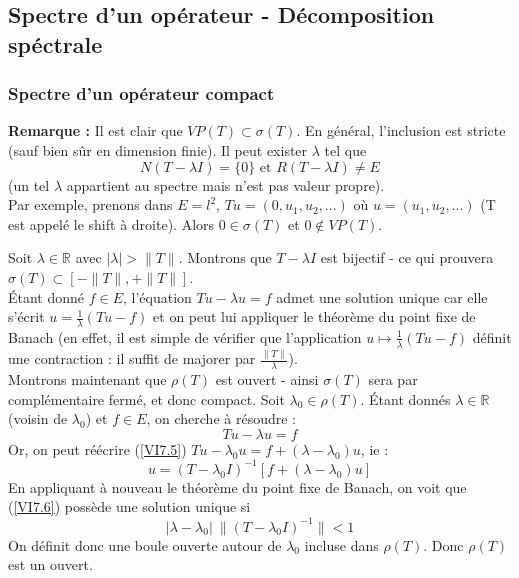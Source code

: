\subsection{Spectre d'un opérateur - Décomposition spéctrale}
\subsubsection{Spectre d'un opérateur compact}

\textbf{Remarque :} Il est clair que $VP(T)\subset \sigma(T)$. En général, l'inclusion est stricte (sauf bien sûr en dimension finie). Il peut exister $\lambda$ tel que 
\[N(T-\lambda I)=\{0\} \text{ et } R(T-\lambda I)\neq E\]
(un tel $\lambda$ appartient au spectre mais n'est pas valeur propre).\\
Par exemple, prenons dans $E=l^2$, $Tu=(0,u_1,u_2,...)$ où $u=(u_1,u_2,...)$ (T est appelé le shift à droite). Alors $0\in\sigma(T)$ et $0\not\in VP(T)$.


\begin{dem}
Soit $\lambda\in\mathbb{R}$ avec $|\lambda|>\|T\|$. Montrons que $T-\lambda I$ est bijectif - ce qui prouvera $\sigma(T)\subset [-\|T\|, +\|T\|]$.\\
Étant donné $f\in E$, l'équation $Tu-\lambda u=f$ admet une solution unique car elle s'écrit $u=\frac{1}{\lambda}(Tu-f)$ et on peut lui appliquer le théorème du point fixe de Banach (en effet, il est simple de vérifier que l'application $u\mapsto\frac{1}{\lambda}(Tu-f)$ définit une contraction : il suffit de majorer par $\frac{\|T\|}{\lambda}$).\\
Montrons maintenant que $\rho(T)$ est ouvert - ainsi $\sigma(T)$ sera par complémentaire fermé, et donc compact. Soit $\lambda_0\in\rho(T)$. Étant donnés $\lambda\in\mathbb{R}$ (voisin de $\lambda_0$) et $f\in E$, on cherche à résoudre :
	\begin{equation} \label{VI7.5} Tu-\lambda u=f \end{equation}
Or, on peut réécrire (\ref{VI7.5}) $Tu-\lambda_0 u=f+(\lambda-\lambda_0)u$, ie : 
	\begin{equation} \label{VI7.6} u=(T-\lambda_0 I)^{-1}[f+(\lambda-\lambda_0)u] \end{equation}
En appliquant à nouveau le théorème du point fixe de Banach, on voit que (\ref{VI7.6}) possède une solution unique si \[|\lambda-\lambda_0|\ \|(T-\lambda_0 I)^{-1}\|<1\]
On définit donc une boule ouverte autour de $\lambda_0$ incluse dans $\rho(T)$. Donc $\rho(T)$ est un ouvert.
\end{dem}

